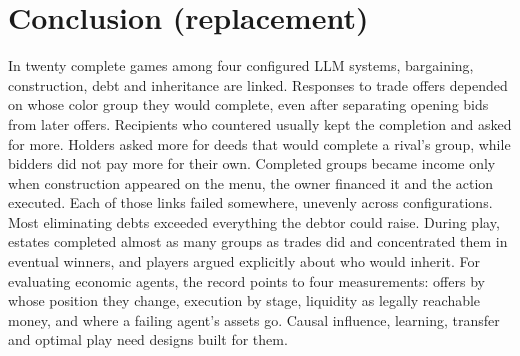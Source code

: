 \section{Conclusion (replacement)}

In twenty complete games among four configured LLM systems, bargaining, construction, debt and inheritance are linked. Responses to trade offers depended on whose color group they would complete, even after separating opening bids from later offers. Recipients who countered usually kept the completion and asked for more. Holders asked more for deeds that would complete a rival's group, while bidders did not pay more for their own. Completed groups became income only when construction appeared on the menu, the owner financed it and the action executed. Each of those links failed somewhere, unevenly across configurations. Most eliminating debts exceeded everything the debtor could raise. During play, estates completed almost as many groups as trades did and concentrated them in eventual winners, and players argued explicitly about who would inherit. For evaluating economic agents, the record points to four measurements: offers by whose position they change, execution by stage, liquidity as legally reachable money, and where a failing agent's assets go. Causal influence, learning, transfer and optimal play need designs built for them.
